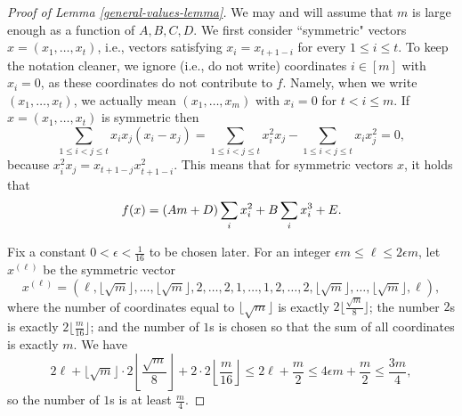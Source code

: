 \documentclass[10pt,a4paper]{amsart}
\begin{document}
\begin{proof}[Proof of Lemma \ref{general-values-lemma}]
    We may and will assume that $m$ is large enough as a function of $A,B,C,D$. 
    We first consider ``symmetric" vectors $x = (x_1,\dots,x_t)$, i.e., vectors satisfying $x_i = x_{t+1-i}$ for every $1 \leq i \leq t$. 
    To keep the notation cleaner, we ignore (i.e., do not write) coordinates $i \in [m]$ with $x_i = 0$, as these coordinates do not contribute to $f$. Namely, when we write $(x_1,\dots,x_t)$, we actually mean $(x_1,\dots,x_m)$ with $x_i = 0$ for $t < i \leq m$. 
    If $x = (x_1,\dots,x_t)$ is symmetric then 
    $$\sum_{1 \leq i < j \leq t} x_i x_j (x_i - x_j) = 
    \sum_{1 \leq i < j \leq t} x_i^2x_j - \sum_{1 \leq i < j \leq t} x_ix_j^2 = 0,$$ because $x_i^2x_j = x_{t+1-j}x_{t+1-i}^2$. This means that for symmetric vectors $x$, it holds that
    $$
    f(x) = (Am+ \nolinebreak D) \sum_{i} x_i^2 + 
	B \sum_{i} x_i^3 + E.
    $$
    
    
    Fix a constant $0 < \epsilon < \frac{1}{16}$ to be chosen later.
    For an integer $\epsilon m \leq \ell \leq 2\epsilon m$, let $x^{(\ell)}$ be the symmetric vector
    $$x^{(\ell)} = (\ell, \lfloor \sqrt{m} \rfloor, \dots, \lfloor \sqrt{m} \rfloor, 2, \dots, 2, 1, \dots, 1, 2, \dots, 2, \lfloor \sqrt{m} \rfloor, \dots, \lfloor \sqrt{m} \rfloor, \ell),$$ 
    where the number of coordinates equal to $\lfloor \sqrt{m} \rfloor$ is exactly $2 \lfloor \frac{\sqrt{m}}{8} \rfloor$; the number $2$s is exactly $2 \lfloor \frac{m}{16} \rfloor$; and the number of $1$s is chosen so that the sum of all coordinates is exactly $m$. 
    We have 
    $$
    2\ell+ \lfloor \sqrt{m} \rfloor \cdot 
    2 \left\lfloor \frac{\sqrt{m}}{8} \right\rfloor + 
    2 \cdot 2 \left\lfloor \frac{m}{16} \right\rfloor \leq 2\ell + \frac{m}{2} \leq 4\epsilon m + \frac{m}{2} \leq \frac{3m}{4},
    $$
    so the number of $1$s is at least $\frac{m}{4}$. 
    


\end{proof}
\end{document}
